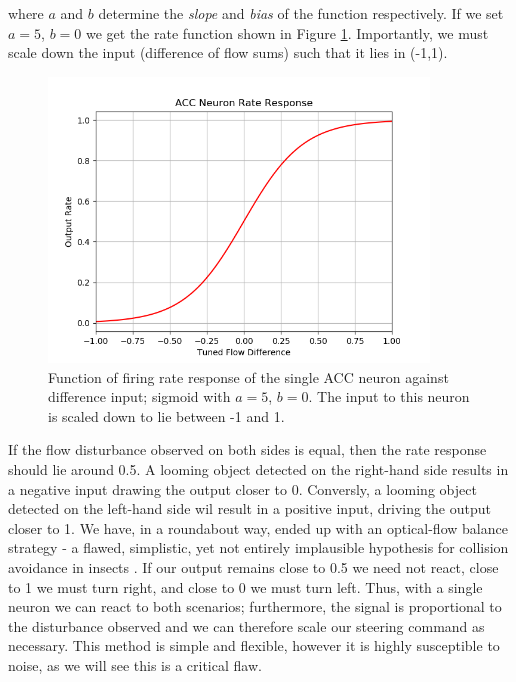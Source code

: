 \documentclass[a4paper,11pt,twoside,openright]{article}
\begin{document}
where $a$ and $b$ determine the \textit{slope} and \textit{bias} of the function
respectively. If we set $a = 5$, $b = 0$ we get the rate function shown in Figure
\ref{fig:accrate}. Importantly, we must scale down the input (difference of flow
sums) such that it lies in (-1,1).\newline\par

\begin{figure}[h!]
  \centering
  \includegraphics[width=0.9\textwidth]{ACCRate}
  \caption{\label{fig:accrate} Function of firing rate response of the single ACC
    neuron against difference input; sigmoid with $a = 5$, $b = 0$. The input to
  this neuron is scaled down to lie between -1 and 1.}
\end{figure}

If the flow disturbance observed on both sides is equal, then the rate
response should lie around 0.5. A looming object detected on the
right-hand side results in a negative input drawing the output closer
to 0. Conversly, a looming object detected on the left-hand side wil
result in a positive input, driving the output closer to 1. We have,
in a roundabout way, ended up with an optical-flow balance strategy -
a flawed, simplistic, yet not entirely implausible hypothesis for
collision avoidance in insects \cite{Julien2017}. If our output
remains close to 0.5 we need not react, close to 1 we must turn right,
and close to 0 we must turn left. Thus, with a single neuron we can
react to both scenarios; furthermore, the signal is proportional to
the disturbance observed and we can therefore scale our steering
command as necessary. This method is simple and flexible, however it is
highly susceptible to noise, as we will see this is a critical flaw.
\newline\par
\end{document}
